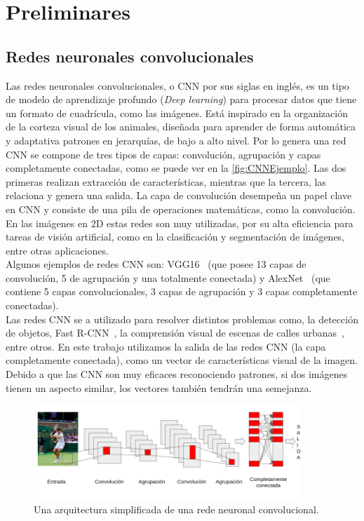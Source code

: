 \chapter{Preliminares}\label{cap:preliminares}


\section{Redes neuronales convolucionales} \label{sec:redesneuronalesconvolucionales}
Las redes neuronales convolucionales, o CNN por sus siglas en inglés, es un tipo de modelo de aprendizaje profundo (\textit{Deep learning}) para procesar datos que tiene un formato de cuadrícula, como las imágenes. Está inspirado en la organización de la corteza visual de los animales, diseñada para aprender de forma automática y adaptativa patrones en jerarquías, de bajo a alto nivel. Por lo genera una red CNN se compone de tres tipos de capas: convolución, agrupación y capas completamente conectadas, como se puede ver en la \autoref{fig:CNNEjemplo}. Las dos primeras realizan extracción de características, mientras que la tercera, las relaciona  y genera una salida. La capa de convolución desempeña un papel clave en CNN y consiste de una pila de operaciones matemáticas, como la convolución. En las imágenes en 2D estas redes son muy utilizadas, por su alta eficiencia para tareas de visión artificial, como en la clasificación y segmentación de imágenes, entre otras aplicaciones.\\

Algunos ejemplos de redes CNN son: VGG16~\cite{simonyan2014very} (que posee 13 capas de convolución, 5 de agrupación y una totalmente conectada) y AlexNet~\cite{krizhevsky2012imagenet} (que contiene 5 capas convolucionales, 3 capas de agrupación y 3 capas completamente conectadas).\\

Las redes CNN se a utilizado para resolver distintos problemas como, la detección de objetos, Fast R-CNN~\cite{girshick2015fast}, la comprensión visual de escenas de calles urbanas~\cite{cordts2016cityscapes}, entre otros. En este trabajo utilizamos la salida de las redes CNN (la capa completamente conectada), como un vector de características visual de la imagen. Debido a que las CNN son muy eficaces reconociendo patrones, si dos imágenes tienen un aspecto similar, los vectores también tendrán una semejanza.

\begin{figure}
	\centering
	\includegraphics[width=0.9\textwidth]{img/red_cnn.png}
	\caption{Una arquitectura simplificada de una rede neuronal convolucional.}
	\label{fig:CNNEjemplo}
\end{figure}

